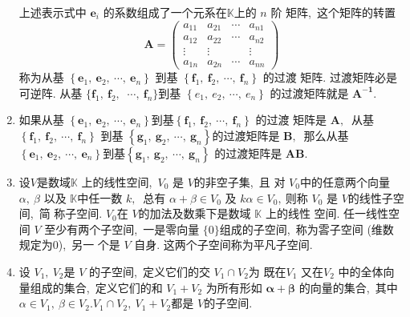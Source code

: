 \begin{enumerate}
		上述表示式中  $\boldsymbol{e}_i $ 的系数组成了一个元系在$  \mathbb{K}  $上的 $n$  阶 矩阵,\  这个矩阵的转置
		$$\boldsymbol{A}=\left(\begin{array}{cccc}
			a_{11} & a_{21} & \cdots & a_{n 1} \\
			a_{12} & a_{22} & \cdots & a_{n 2} \\
			\vdots & \vdots & & \vdots \\
			a_{1 n} & a_{2 n} & \cdots & a_{n n}
		\end{array}\right)$$
		称为从基 $\left\{\boldsymbol{e}_{1},\  \boldsymbol{e}_{2},\  \cdots,\  \boldsymbol{e}_{n}\right\} $ 到基 $ \left\{\boldsymbol{f}_{1},\  \boldsymbol{f}_{2},\  \cdots,\  \boldsymbol{f}_{n}\right\} $ 的过渡 矩阵. 过渡矩阵必是可逆阵. 从基  $\{\boldsymbol{f}_{1},\  \boldsymbol{f}_{2},\ $ $ \cdots,\  \boldsymbol{f}_{n}\}  $到基 $ \left\{e_{1},\  e_{2},\  \cdots,\  e_{n}\right\} $ 的过渡矩阵就是 $ \boldsymbol{A^{-1}} .$
		\item 如果从基  $\left\{\boldsymbol{e}_{1},\  \boldsymbol{e}_{2},\  \cdots,\  \boldsymbol{e}_{n}\right\}  $到基$  \left\{\boldsymbol{f}_{1},\  \boldsymbol{f}_{2},\  \cdots,\  \boldsymbol{f}_{n}\right\} $ 的过渡 矩阵是  $\boldsymbol{A} ,\ $ 从基  $\left\{\boldsymbol{f}_{1},\  \boldsymbol{f}_{2},\  \cdots,\  \boldsymbol{f}_{n}\right\} $ 到基  $\left\{\boldsymbol{g}_{1},\  \boldsymbol{g}_{2},\  \cdots,\  \boldsymbol{g}_{n}\right\}  $的过渡矩阵是 $ \boldsymbol{B} ,\ $ 那么从基  $\left\{\boldsymbol{e}_{1},\  \boldsymbol{e}_{2},\  \cdots,\  \boldsymbol{e}_{n}\right\}  $到基$  \left\{\boldsymbol{g}_{1},\  \boldsymbol{g}_{2},\  \cdots,\  \boldsymbol{g}_{n}\right\} $ 的过渡矩阵是  $\boldsymbol{AB} .$
		\item 设$  V  $是数域$  \mathbb{K} $ 上的线性空间,\  $ V_{0} $ 是 $ V  $的非空子集,\  且 对  $V_{0}  $中的任意两个向量 $ \alpha,\  \beta $ 以及  $\mathbb{K}$中任一数  $k ,\ $ 总有 $ \alpha+\beta \in V_{0}$  及 $ k \alpha \in V_{0} ,\  $则称 $ V_{0}$  是  $V  $的线性子空间,\  简 称子空间.  $V_{0}  $在 $ V  $的加法及数乘下是数域 $ \mathbb{K} $ 上的线性 空间. 任一线性空间  $V $ 至少有两个子空间,\ 一是零向量 $ \{0\}  $组成的子空间,\  称为䨐子空间 (维数规定为$ 0$),\  另一 个是  $V$  自身. 这两个子空间称为平凡子空间.
		\item 设 $ V_{1},\  V_{2}$是 $ V $ 的子空间,\  定义它们的交 $ V_{1} \cap V_{2}  $为 既在$  V_{1} $ 又在$  V_{2}$  中的全体向量组成的集合,\  定义它们的和 $ V_{1}+V_{2} $ 为所有形如 $ \boldsymbol{\alpha}+\boldsymbol{\beta}$  的向量的集合,\  其中  $\alpha \in V_{1},\  \beta \in V_{2} .
		V_{1} \cap V_{2},\  V_{1}+V_{2}  $都是 $ V  $的子空间.

\end{enumerate}
